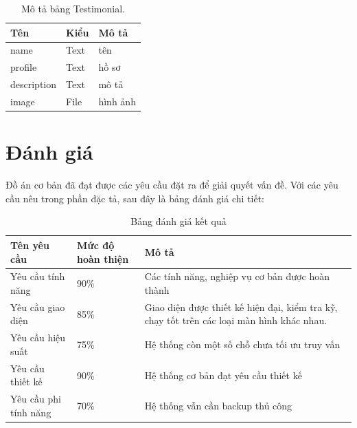 \documentclass[11pt]{report}
\begin{document}
	
	\begin{table}[h!]
		\begin{center}
			\caption{Mô tả bảng Testimonial.}
			\begin{tabularx}{0.6\textwidth}{ |l|l|X| } 
				\hline
				Tên & Kiểu & Mô tả \\
				\hline
				name & Text & tên \\
				profile & Text & hồ sơ \\
				description & Text & mô tả \\
				image & File & hình ảnh \\ 
				\hline
			\end{tabularx}
			\label{table:Testimonial}
		\end{center}
	\end{table}
	
	
	
	
	
	
	\section{Đánh giá}

Đồ án cơ bản đã đạt được các yêu cầu đặt ra để giải quyết vấn đề. Với các yêu cầu nêu trong phần đặc tả, sau đây là bảng đánh giá chi tiết:

	\begin{table}[h!]
	\begin{center}
		\caption{Bảng đánh giá kết quả}
		\begin{tabularx}{0.8\textwidth}{ |l|l|X| } 
			\hline
			Tên yêu cầu & Mức độ hoàn thiện & Mô tả\\
			\hline
			Yêu cầu tính năng & 90\% & Các tính năng, nghiệp vụ cơ bản được hoàn thành\\
			Yêu cầu giao diện & 85\% & Giao diện được thiết kế hiện đại, kiểm tra kỹ, chạy tốt trên các loại màn hình khác nhau. \\
			Yêu cầu hiệu suất & 75\% & Hệ thống còn một số chỗ chưa tối ưu truy vấn \\
			Yêu cầu thiết kế & 90\% & Hệ thống cơ bản đạt yêu cầu thiết kế \\
			Yêu cầu phi tính năng & 70\% & Hệ thống vẫn cần backup thủ công \\
			\hline
		\end{tabularx}

	\end{center}
\end{table}
\end{document}
